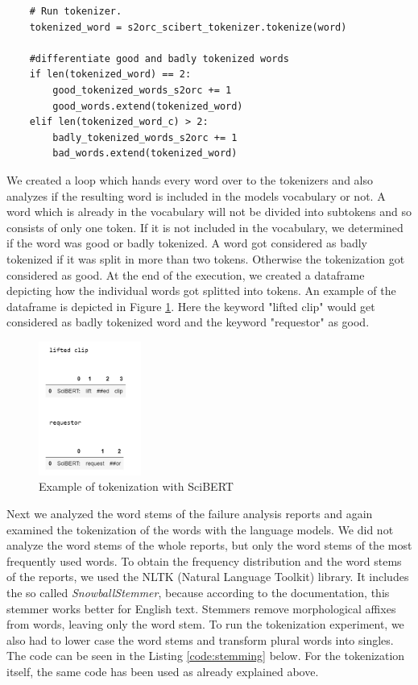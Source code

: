 \begin{code}
	\label{code:tokenizing}
\begin{verbatim}
	# Run tokenizer.
	tokenized_word = s2orc_scibert_tokenizer.tokenize(word)
	
	#differentiate good and badly tokenized words
	if len(tokenized_word) == 2:
		good_tokenized_words_s2orc += 1
		good_words.extend(tokenized_word) 
	elif len(tokenized_word_c) > 2:
		badly_tokenized_words_s2orc += 1
		bad_words.extend(tokenized_word)
\end{verbatim}
\end{code}

We created a loop which hands every word over to the tokenizers and also analyzes if the resulting word is included in the models vocabulary or not. A word which is already in the vocabulary will not be divided into subtokens and so consists of only one token. If it is not included in the vocabulary, we determined if the word was good or badly tokenized. A word got considered as badly tokenized if it was split in more than two tokens. Otherwise the tokenization got considered as good. At the end of the execution, we created a dataframe depicting how the individual words got splitted into tokens. An example of the dataframe is depicted in Figure \ref{fig:goodAndBad}. Here the keyword "lifted clip" would get considered as badly tokenized word and the keyword "requestor" as good.

\begin{figure}[H]
	\centering
	\includegraphics[width=0.3\textwidth]{figures/example_good_bad.PNG}
	\caption{Example of tokenization with SciBERT}
	\label{fig:goodAndBad}
\end{figure}


Next we analyzed the word stems of the failure analysis reports and again examined the tokenization of the words with the language models. We did not analyze the word stems of the whole reports, but only the word stems of the most frequently used words. To obtain the frequency distribution and the word stems of the reports, we used the NLTK (Natural Language Toolkit) library. It includes the so called \textit{SnowballStemmer}, because according to the documentation, this stemmer works better for English text. Stemmers remove morphological affixes from words, leaving only the word stem. To run the tokenization experiment, we also had to lower case the word stems and transform plural words into singles. The code can be seen in the Listing \ref{code:stemming} below. For the tokenization itself, the same code has been used as already explained above.

